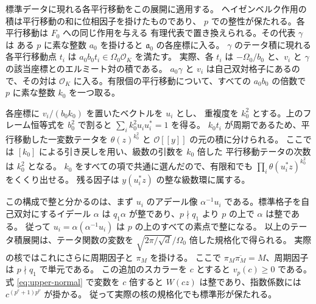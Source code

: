 標準データに現れる各平行移動をこの展開に適用する。
ヘイゼンベルク作用の積は平行移動の和に位相因子を掛けたものであり、
\(p\) での整性が保たれる。各平行移動は \(F_0\) への同じ作用を与える
有理代表で置き換えられる。その代表 \(\gamma\) は
ある \(p\) に素な整数 \(a_0\) を掛けると \(\mathfrak a_0\) の各座標に入る。
\(\gamma\) のテータ積に現れる各平行移動点 \(t_i\) は
\(a_0 b_0 t_i\in\Omega_0\mathcal O_K\) を満たす。
実際、各 \(t_i\) は \(-\Omega_0/b_0\) と、\(v_i\) と
\(\gamma\) の該当座標とのエルミート対の積である。
\(a_0\gamma\) と \(v_i\) は自己双対格子にあるので、その対は
\(\mathcal O_K\) に入る。有限個の平行移動について、すべての
\(a_0 b_0\) の倍数で \(p\) に素な整数 \(k_0\) を一つ取る。

各座標に \(v_i/(b_0 k_0)\) を置いたベクトルを \(u_i\) とし、
重複度を \(k_0^2\) とする。上のフレーム恒等式を \(b_0^2\) で割ると
\(\sum_i k_0^2u_i u_i^\ast=1\) を得る。
\(k_0 t_i\) が周期であるため、平行移動した一変数テータを
\(\theta(z)^{k_0^2}\) と \(\mathcal O[[y]]\) の元の積に分けられる。
ここでは \([k_0]\) による引き戻しを用い、級数の引数を \(k_0\) 倍した
平行移動テータの次数は \(k_0^2\) となる。
\(k_0\) をすべての項で共通に選んだので、有限和でも
\(\prod_i\theta(u_i^\ast z)^{k_0^2}\) をくくり出せる。
残る因子は \(y(u_i^\ast z)\) の整な級数環に属する。

この構成で整と分かるのは、まず \(u_i\) のアデール像
\(\alpha^{-1}u_i\) である。標準格子を自己双対にするイデール \(\alpha\) は
\(q_1\alpha\) が整であり、\(p\nmid q_1\) より \(p\) の上で \(\alpha\) は整である。
従って \(u_i=\alpha(\alpha^{-1}u_i)\) は \(p\) の上のすべての素点で整になる。
以上のテータ積展開は、テータ関数の変数を
\(\sqrt{2\pi/\sqrt d}/\Omega_0\) 倍した規格化で得られる。
実際の核ではこれにさらに周期因子と \(\pi_M\) を掛ける。
ここで \(\pi_M\overline{\pi_M}=M\)、周期因子は \(p\nmid q_1\) で単元である。
この追加のスカラーを \(c\) とすると \(v_p(c)\ge0\) である。
式 \eqref{eq:upper-normal} で変数を \(c\) 倍すると
\(W(cz)\) は整であり、指数係数には \(c^{(p^e+1)p^\nu}\) が掛かる。
従って実際の核の規格化でも標準形が保たれる。

